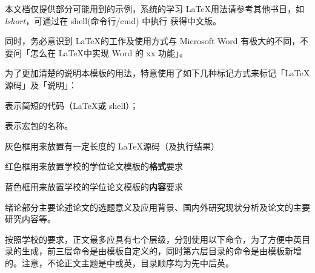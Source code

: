 


本文档仅提供部分可能用到的示例，系统的学习 \LaTeX 用法请参考其他书目，如 \emph{lshort}，可通过在 shell(命令行/cmd) 中执行  获得中文版。

同时，务必意识到 \LaTeX 的工作及使用方式与 Microsoft Word 有极大的不同，不要问「怎么在 \LaTeX 中实现 Word 的 xx 功能」。


为了更加清楚的说明本模板的用法，特意使用了如下几种标记方式来标记「\LaTeX 源码」及「说明」：

表示简短的代码（\LaTeX 或 shell）；

表示宏包的名称。

\begin{tcolorbox}
  灰色框用来放置有一定长度的 \LaTeX 源码（及执行结果）
\end{tcolorbox}

\begin{tcolorbox}[colback=red!5!white,colframe=red!75!black]
  红色框用来放置学校的学位论文模板的\textbf{格式}要求
\end{tcolorbox}

\begin{tcolorbox}[colback=blue!5!white,colframe=blue!75!black]
  蓝色框用来放置学校的学位论文模板的\textbf{内容}要求
\end{tcolorbox}


\clearpage

\begin{tcolorbox}[colback=blue!5!white,colframe=blue!75!black,title=绪论部分的要求]
  绪论部分主要论述论文的选题意义及应用背景、国内外研究现状分析及论文的主要研究内容等。
\end{tcolorbox}



按照学校的要求，正文最多应具有七个层级，分别使用以下命令，为了方便中英目录的生成，前三层命令是由模板自定义的，同时第六层目录的命令是由模板新增的。注意，不论正文主题是中或英，目录顺序均为先中后英。

